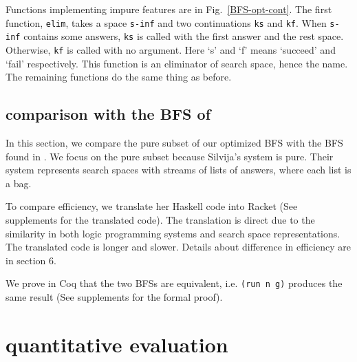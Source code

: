 \documentclass[format=acmlarge, review=true, authordraft=true]{acmart}
\begin{document}
Functions implementing impure features are in Fig.~\ref{BFS-opt-cont}. The 
first function, \texttt{elim}, takes a space \texttt{s-inf} and two 
continuations \texttt{ks} and \texttt{kf}. When \texttt{s-inf} contains some 
answers, \texttt{ks} is called with the first answer and the rest space. 
Otherwise, \texttt{kf} is called with no argument. Here `s' and `f' means 
`succeed' and `fail' respectively. This function is an eliminator of search 
space, hence the name. The remaining functions do the same thing as before.

\subsection{comparison with the BFS of \citet{seres1999algebra}}

In this section, we compare the pure subset of our optimized BFS with the BFS 
found in \citet{seres1999algebra}. We focus on the pure subset because 
Silvija's system is pure. Their system represents search spaces with streams of 
lists of answers, where each list is a bag.

To compare efficiency, we translate her Haskell code into Racket (See 
supplements for the translated code). The translation is direct 
due to the similarity in both logic programming systems and search space 
representations. The translated code is longer and slower. Details about 
difference in efficiency are in section 6.

We prove in Coq that the two BFSs are equivalent, i.e. \texttt{(run n g)} 
produces the same result (See supplements for the formal proof).

\section{quantitative evaluation}
\end{document}
